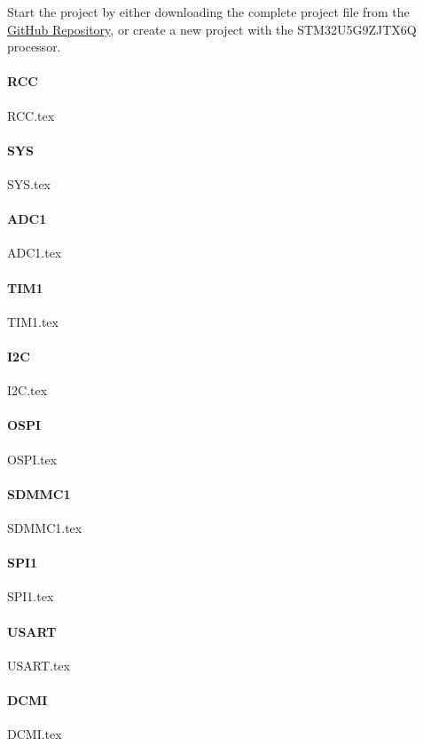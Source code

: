 Start the project by either downloading the complete project file from the \href{https://github.com/PerthAerospaceStudentTeam/C2S/tree/main/Software/v0.1}{GitHub Repository}, or create a new project with the STM32U5G9ZJTX6Q processor.

\paragraph{RCC}
{RCC.tex}

\paragraph{SYS}
{SYS.tex}

\paragraph{ADC1}
{ADC1.tex}

\paragraph{TIM1}
{TIM1.tex}

\paragraph{I2C}
{I2C.tex}

\paragraph{OSPI}
{OSPI.tex}

\paragraph{SDMMC1}
{SDMMC1.tex}

\paragraph{SPI1}
{SPI1.tex}

\paragraph{USART}
{USART.tex}

\paragraph{DCMI}
{DCMI.tex}

